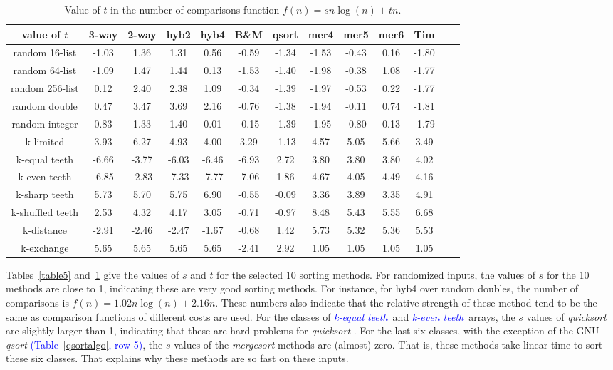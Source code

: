 \documentclass[AMA,STIX1COL]{WileyNJD-v2}
\newcommand{\keq}{\textcolor{blue}{\emph{k-equal teeth}}}
\newcommand{\kev}{\textcolor{blue}{\emph{k-even teeth}}}
\newcommand{\qusort}{\emph{quicksort }}
\newcommand{\qsort}{\emph{qsort }}
\newcommand{\msort}{\emph{mergesort }}
\begin{document}
\begin{table}
\caption{Value of $t$ in the number of comparisons function $f(n) = sn\log(n) + tn$.}
\centering
\begin{tabular}{|c|c|c|c|c|c|c|c|c|c|c|c|c|}
\toprule
value of $t$ & 3-way & 2-way & hyb2 & hyb4 & B\&M& qsort & mer4 & mer5 & mer6 & Tim \\
\midrule
random 16-list	&-1.03	&1.36	&1.31	&0.56	&-0.59	&-1.34	&-1.53	&-0.43	&0.16&	-1.80\\
random 64-list&-1.09&	1.47&	1.44&	0.13&	-1.53&	-1.40&	-1.98&	-0.38&	1.08&	-1.77\\
random 256-list&0.12	&2.40	&2.38	&1.09	&-0.34	&-1.39	&-1.97	&-0.53	&0.22	&-1.77\\
random double&0.47&	 3.47&	 3.69& 	2.16&	-0.76	 &-1.38&	-1.94&	-0.11&	0.74&	-1.81\\
random integer&0.83& 	1.33&	1.40&	0.01&	-0.15&	-1.39&	-1.95&	-0.80&	0.13&	-1.79\\
k-limited&	3.93	&6.27	&4.93	&4.00	&3.29	&-1.13	&4.57	&5.05	&5.66	&3.49\\
k-equal teeth&	-6.66	& -3.77&	-6.03&	-6.46&	-6.93&	2.72&	3.80&	3.80&	3.80&	4.02\\
k-even teeth&	-6.85	& -2.83	 &-7.33	&-7.77	&-7.06	&1.86	&4.67	&4.05	&4.49	&4.16\\
k-sharp teeth&	5.73	&5.70&	5.75&	6.90&	-0.55&	-0.09&	3.36&	3.89&	3.35&	4.91\\
k-shuffled teeth&2.53	&4.32	&4.17	&3.05	&-0.71	&-0.97	&8.48	&5.43	&5.55	&6.68\\
k-distance&-2.91&	-2.46&	-2.47&	-1.67&	-0.68&	1.42&	5.73&	5.32&	5.36&	5.53\\
k-exchange&	5.65	&5.65	&5.65	&5.65	&-2.41	&2.92	&1.05	&1.05	&1.05	&1.05\\
\bottomrule
\end{tabular}
\label{table6}
\end{table}

Tables~\ref{table5} and~\ref{table6} give the values of $s$ and $t$ for the selected 10 sorting methods. 
For randomized inputs, the values of $s$ for the 10 methods are close to 1, indicating these are very good sorting methods. 
For instance, for hyb4 over random doubles, the number of comparisons is $f(n) = 1.02n\log(n) + 2.16n$. 
These numbers also indicate that the relative strength of these method tend to be the same as comparison functions of different costs are used. 
For the classes of \keq\ and \kev\ arrays, the $s$ values of \qusort are slightly larger than 1, indicating that these are hard problems for \qusort. 
For the last six classes, with the exception of the GNU \qsort \textcolor{blue}{(Table~\ref{qsortalgo}, row 5)}, the $s$ values of the \msort methods are (almost) zero. 
That is, these methods take linear time to sort these six classes.  
That explains why these methods are so fast on these inputs.
\end{document}
